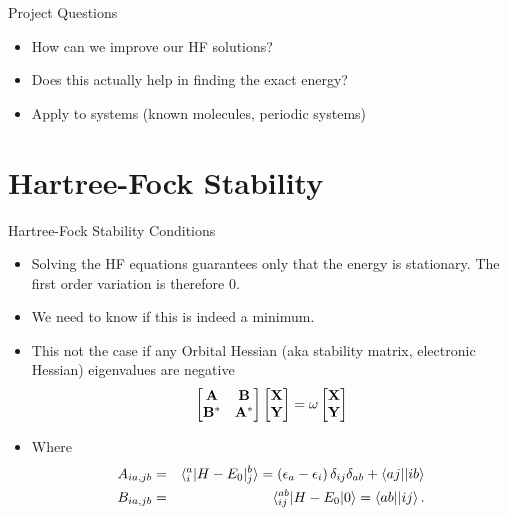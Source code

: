 \documentclass[10pt]{beamer}
\begin{document}
{{\begin{frame}{Project Questions}
	\begin{itemize}[<+->]
		\item {How can we improve our HF solutions?}
		\item {Does this actually help in finding the exact energy?}
		\item {Apply to systems (known molecules, periodic systems)}
	\end{itemize}
\end{frame}


\section{Hartree-Fock Stability}

{%

\begin{frame}{Hartree-Fock Stability Conditions}
	\begin{itemize}[<+->]
		\item Solving the HF equations guarantees only that the energy is \alert{stationary}. The first 
		order variation is therefore 0.
		\item We need to know if this is indeed a minimum.
		\item{This not the case if any \alert{Orbital Hessian} (aka stability matrix, electronic 
		Hessian) eigenvalues are \alert{negative}
			\begin{eqnarray}
				\begin{bmatrix}
					\bf{A}   & \bf{B}   \\
					\bf{B}^* & \bf{A}^* \\
				\end{bmatrix}
				\begin{bmatrix}  \bf{X} \\ \bf{Y}  \end{bmatrix}
				= \omega \begin{bmatrix}  \bf{X} \\ \bf{Y}  \end{bmatrix}
			\end{eqnarray}
		}
		\item{Where}
		\begin{eqnarray}
			A_{ia,jb} &=& \braket{{}_i^a|H-E_0|{}_j^b} = \left(\epsilon_a - \epsilon_i \right) \delta_{ij}\delta_{ab} + \braket{aj||ib}
			\nonumber \\
			B_{ia,jb} &=& \braket{{}_{ij}^{ab}|H-E_0|0} = \braket{ab||ij}.
		\end{eqnarray}
	\end{itemize}
\end{frame}


}}}
\end{document}
